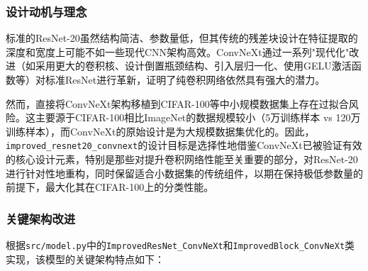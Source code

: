 \documentclass[a4paper]{article}
\begin{document}
\subsubsection{设计动机与理念}

标准的ResNet-20虽然结构简洁、参数量低，但其传统的残差块设计在特征提取的深度和宽度上可能不如一些现代CNN架构高效。ConvNeXt通过一系列"现代化"改进（如采用更大的卷积核、设计倒置瓶颈结构、引入层归一化、使用GELU激活函数等）对标准ResNet进行革新，证明了纯卷积网络依然具有强大的潜力。

然而，直接将ConvNeXt架构移植到CIFAR-100等中小规模数据集上存在过拟合风险。这主要源于CIFAR-100相比ImageNet的数据规模较小（5万训练样本 vs 120万训练样本），而ConvNeXt的原始设计是为大规模数据集优化的。因此，\texttt{improved\_resnet20\_convnext}的设计目标是选择性地借鉴ConvNeXt已被验证有效的核心设计元素，特别是那些对提升卷积网络性能至关重要的部分，对ResNet-20进行针对性地重构，同时保留适合小数据集的传统组件，以期在保持极低参数量的前提下，最大化其在CIFAR-100上的分类性能。

\subsubsection{关键架构改进}

根据\texttt{src/model.py}中的\texttt{ImprovedResNet\_ConvNeXt}和\texttt{ImprovedBlock\_ConvNeXt}类实现，该模型的关键架构特点如下：
\end{document}
